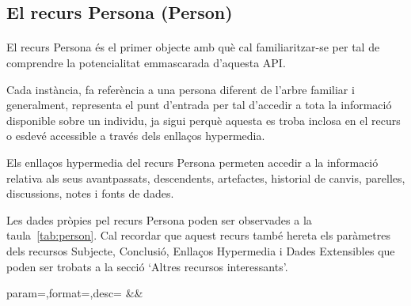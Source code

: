 \subsection{El recurs Persona (Person)}

    \paragraph{}
    El recurs Persona és el primer objecte amb què cal familiaritzar-se per tal de comprendre la potencialitat emmascarada d'aquesta API.

    Cada instància, fa referència a una persona diferent de l'arbre familiar i generalment, representa el punt d'entrada per tal d'accedir a tota la informació disponible sobre un individu, ja sigui perquè aquesta es troba inclosa en el recurs o esdevé accessible a través dels enllaços hypermedia.

    Els enllaços hypermedia del recurs Persona permeten accedir a la informació relativa als seus avantpassats, descendents, artefactes, historial de canvis, parelles, discussions, notes i fonts de dades.

    Les dades pròpies pel recurs Persona poden ser observades a la taula~\ref{tab:person}. Cal recordar que aquest recurs també hereta els paràmetres dels recursos Subjecte, Conclusió, Enllaços Hypermedia i Dades Extensibles que poden ser trobats a la secció `Altres recursos interessants'.

    \begin{center}
             {param=\param,format=\format,desc=\desc}
             {\param&\format&\desc}
     \end{center}
